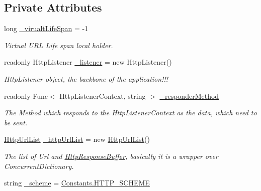 \subsection*{Private Attributes}
\begin{DoxyCompactItemize}
\item 
long \mbox{\hyperlink{class_concord_1_1_c3_http_module_1_1_web_server_adbb7b3ec87d6021801930c29b21e6ef5}{\+\_\+virualt\+Life\+Span}} = -\/1
\begin{DoxyCompactList}\small\item\em Virtual U\+RL Life span local holder. \end{DoxyCompactList}\item 
readonly Http\+Listener \mbox{\hyperlink{class_concord_1_1_c3_http_module_1_1_web_server_a9fcf48705c4fba563e06f29fbea6c803}{\+\_\+listener}} = new Http\+Listener()
\begin{DoxyCompactList}\small\item\em Http\+Listener object, the backbone of the application!!! \end{DoxyCompactList}\item 
readonly Func$<$ Http\+Listener\+Context, string $>$ \mbox{\hyperlink{class_concord_1_1_c3_http_module_1_1_web_server_af7c99a81dca2bd0079d3e22fb247e297}{\+\_\+responder\+Method}}
\begin{DoxyCompactList}\small\item\em The Method which responds to the Http\+Listener\+Context as the data, which need to be sent. \end{DoxyCompactList}\item 
\mbox{\hyperlink{class_concord_1_1_c3_http_module_1_1_http_url_list}{Http\+Url\+List}} \mbox{\hyperlink{class_concord_1_1_c3_http_module_1_1_web_server_aaea2f407ddadea5271a7ba77017a43d0}{\+\_\+http\+Url\+List}} = new \mbox{\hyperlink{class_concord_1_1_c3_http_module_1_1_http_url_list}{Http\+Url\+List}}()
\begin{DoxyCompactList}\small\item\em The list of Url and \mbox{\hyperlink{class_concord_1_1_c3_http_module_1_1_http_response_buffer}{Http\+Response\+Buffer}}, basically it is a wrapper over Concurrent\+Dictionary. \end{DoxyCompactList}\item 
string \mbox{\hyperlink{class_concord_1_1_c3_http_module_1_1_web_server_a1d7bbb290d534e300796f0cc3024ca53}{\+\_\+scheme}} = \mbox{\hyperlink{class_concord_1_1_c3_http_module_1_1_constants_ad5d0cf769b25bef58e712036c67b915b}{Constants.\+H\+T\+T\+P\+\_\+\+S\+C\+H\+E\+ME}}

\end{DoxyCompactItemize}
